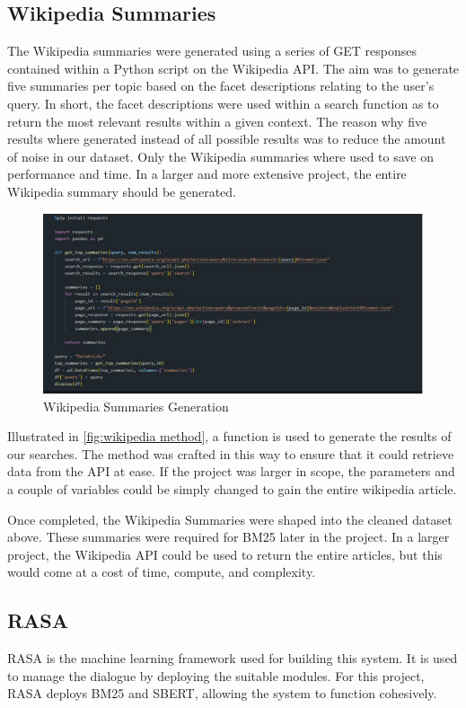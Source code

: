 \documentclass[11pt]{article}
\begin{document}
\subsection{Wikipedia Summaries}
The Wikipedia summaries were generated using a series of GET responses contained within a Python script on the Wikipedia API. The aim was to generate five summaries per topic based on the facet descriptions \textendash{} relating to the user's query. In short, the facet descriptions were used within a search function as to return the most relevant results within a given context. The reason why five results where generated instead of all possible results was to reduce the amount of noise in our dataset. Only the Wikipedia summaries where used to save on performance and time. In a larger and more extensive project, the entire Wikipedia summary should be generated. 

\begin{figure}[htbp]
  \centering
  \includegraphics[width=\linewidth]{./img/wiki.png}
  \caption{Wikipedia Summaries Generation}
  \label{fig:wikipedia method}
\end{figure}

Illustrated in \autoref{fig:wikipedia method}, a function is used to generate the results of our searches. The method was crafted in this way to ensure that it could retrieve data from the API at ease. If the project was larger in scope, the parameters and a couple of variables could be simply changed to gain the entire wikipedia article. 

Once completed, the Wikipedia Summaries were shaped into the cleaned dataset above. These summaries were required for BM25 later in the project. In a larger project, the Wikipedia API could be used to return the entire articles, but this would come at a cost of time, compute, and complexity.

\subsection{{RASA}}
RASA is the machine learning framework used for building this system. It is used to manage the dialogue by deploying the suitable modules. For this project, RASA deploys BM25 and SBERT, allowing the system to function cohesively. 
\end{document}
